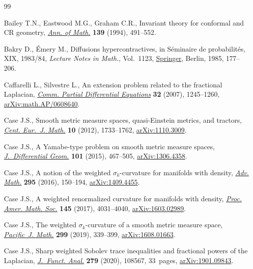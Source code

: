 \documentclass[10pt,a4paper]{amsart}
\numberwithin{equation}{section}
\begin{document}
\begin{thebibliography}{99}
\footnotesize\itemsep=-1pt

Bailey T.N., Eastwood M.G., Graham C.R., Invariant theory for conformal and
 {CR} geometry, \href{https://doi.org/10.2307/2118571}{\textit{Ann. of Math.}} \textbf{139} (1994), 491--552.

Bakry D., \'Emery M., Diffusions hypercontractives, in S\'eminaire de
 probabilit\'es, {XIX}, 1983/84, \textit{Lecture Notes in Math.}, Vol.~1123,
 \href{https://doi.org/10.1007/BFb0075847}{Springer}, Berlin, 1985, 177--206.

Caffarelli L., Silvestre L., An extension problem related to the fractional
 {L}aplacian, \href{https://doi.org/10.1080/03605300600987306}{\textit{Comm. Partial Differential Equations}} \textbf{32}
 (2007), 1245--1260, \href{https://arxiv.org/abs/math.AP/0608640}{arXiv:math.AP/0608640}.

Case J.S., Smooth metric measure spaces, quasi-{E}instein metrics, and
 tractors, \href{https://doi.org/10.2478/s11533-012-0091-x}{\textit{Cent. Eur.~J. Math.}} \textbf{10} (2012), 1733--1762,
 \href{https://arxiv.org/abs/1110.3009}{arXiv:1110.3009}.

Case J.S., A {Y}amabe-type problem on smooth metric measure spaces,
 \href{https://doi.org/10.4310/jdg/1445518921}{\textit{J.~Differential Geom.}} \textbf{101} (2015), 467--505,
 \href{https://arxiv.org/abs/1306.4358}{arXiv:1306.4358}.

Case J.S., A notion of the weighted {$\sigma_k$}-curvature for manifolds with
 density, \href{https://doi.org/10.1016/j.aim.2016.03.010}{\textit{Adv. Math.}} \textbf{295} (2016), 150--194,
 \href{https://arxiv.org/abs/1409.4455}{arXiv:1409.4455}.

Case J.S., A weighted renormalized curvature for manifolds with density,
 \href{https://doi.org/10.1090/proc/13566}{\textit{Proc. Amer. Math. Soc.}} \textbf{145} (2017), 4031--4040,
 \href{https://arxiv.org/abs/1603.02989}{arXiv:1603.02989}.

Case J.S., The weighted {$\sigma_k$}-curvature of a smooth metric measure
 space, \href{https://doi.org/10.2140/pjm.2019.299.339}{\textit{Pacific~J. Math.}} \textbf{299} (2019), 339--399,
 \href{https://arxiv.org/abs/1608.01663}{arXiv:1608.01663}.

Case J.S., Sharp weighted {S}obolev trace inequalities and fractional powers of
 the {L}aplacian, \href{https://doi.org/10.1016/j.jfa.2020.108567}{\textit{J.~Funct. Anal.}} \textbf{279} (2020), 108567, 33~pages,
 \href{https://arxiv.org/abs/1901.09843}{arXiv:1901.09843}.


\end{thebibliography}
\end{document}
